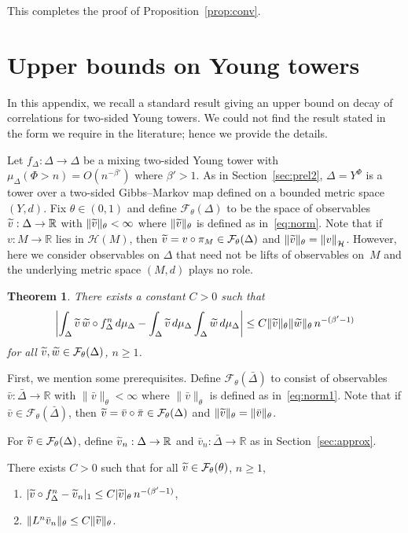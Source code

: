 \documentclass[10pt]{amsart}
\newtheorem{theo}{Theorem}[section]
\theoremstyle{definition}\newtheorem{defi}[theo]{Definition}\newtheorem{rema}[theo]{Remark}\newtheorem{exam}[theo]{Example}\newtheorem{exem}[theo]{Example}\newtheorem{nota}[theo]{Notation}
\newcommand{\R}{\mathbb{R}}
\newcommand{\cF}{\mathcal{F}}
\newcommand{\cH}{\mathcal{H}}
\newcommand{\tw}{\widetilde{w}}
\newcommand{\tv}{\tilde{v}}
\newcommand{\bDelta}{\bar{\Delta}}
\newcommand*{\alphenumi}{\renewcommand*{\theenumi}{\alph{enumi}}}
\let\oldtilde\tilde
\renewcommand*{\tilde}[1]{\mathchoice{\widetilde{#1}}{\widetilde{#1}}{\oldtilde{#1}}{\oldtilde{#1}}}
\begin{document}
This completes the proof of Proposition~\ref{prop:conv}.



\section{Upper bounds on Young towers}\label{app:upper}

In this appendix, we recall a standard result giving an upper bound on decay of correlations for two-sided Young towers. We could not find the result stated in the form we require in the literature; hence we provide the details.

Let $f_\Delta:\Delta\to\Delta$ be a mixing two-sided Young tower with $\mu_\Delta(\Phi>n)=O(n^{-\beta'})$ where $\beta'>1$. As in Section~\ref{sec:prel2}, $\Delta=Y^\Phi$ is a tower over a two-sided Gibbs--Markov map defined on a bounded metric space $(Y,d)$. Fix $\theta\in(0,1)$ and define $\cF_\theta(\Delta)$ to be the space of observables $\tv:\Delta\to\R$ with $\|\tv\|_\theta<\infty$ where $\|\tv\|_\theta$ is defined as in~\eqref{eq:norm}. Note that if $v:M\to\R$ lies in $\cH(M)$, then $\tv=v\circ\pi_M\in\cF_\theta(\Delta)$ and $\|\tv\|_\theta={\|v\|}_\cH$. However, here we consider observables on $\Delta$ that need not be lifts of observables on~$M$ and the underlying metric space $(M,d)$ plays no role.

\begin{theo} \label{thm:upper}
There exists a constant $C>0$ such that
\[
\left| \int_\Delta \tv\,\tw\circ f_\Delta^n\,d\mu_\Delta -\int_\Delta \tv\,d\mu_\Delta
\int_\Delta \tw\,d\mu_\Delta\right|
\le C\|\tv\|_\theta \|\tw\|_\theta \, n^{-(\beta'-1)}
\]
for all $\tv,\tw\in\cF_\theta(\Delta)$, $n\ge1$.
\end{theo}

First, we mention some prerequisites. Define $\cF_\theta(\bDelta)$ to consist of observables $\bar v:\bDelta\to\R$ with $\|\bar v\|_\theta<\infty$ where $\|\bar v\|_\theta$ is defined as in~\eqref{eq:norm1}. Note that if $\bar v\in \cF_\theta(\bDelta)$, then $\tv=\bar v\circ\bar\pi\in\cF_\theta(\Delta)$ and $\|\tv\|_\theta =\|\bar v\|_\theta$.

For $\tv\in\cF_\theta(\Delta)$, define $\tv_n:\Delta\to\R$ and $\bar v_n:\bDelta\to\R$ as in Section~\ref{sec:approx}.

\goodbreak
\begin{prop}\label{prop:prel}
There exists $C>0$ such that for all $\tv\in\cF_\theta(\theta)$, $n\ge1$,
\begin{enumerate}\alphenumi
\item \label{propB.2.1}$|\tv\circ f_\Delta^n-\tv_n|_1\le C|\tv|_\theta\,n^{-(\beta'-1)}$,
\item \label{propB.2.2}$\|L^n\bar v_n\|_\theta \le C\|\tv\|_\theta$.
\end{enumerate}


\end{prop}
\end{document}
